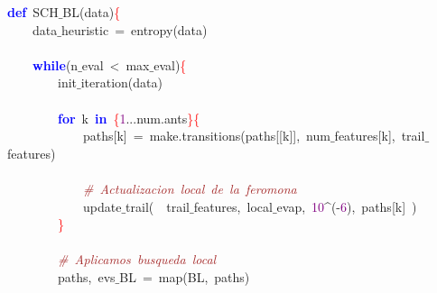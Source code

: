 \noindent
\mbox{}\textbf{\textcolor{Blue}{def}}\ SCH$\_$BL\textcolor{BrickRed}{(}data\textcolor{BrickRed}{)}\textcolor{Red}{\{} \\
\mbox{}\ \ \ \ data$\_$heuristic\ \textcolor{BrickRed}{=}\ entropy\textcolor{BrickRed}{(}data\textcolor{BrickRed}{)} \\
\mbox{} \\
\mbox{}\ \ \ \ \textbf{\textcolor{Blue}{while}}\textcolor{BrickRed}{(}n$\_$eval\ \textcolor{BrickRed}{\textless{}}\ max$\_$eval\textcolor{BrickRed}{)}\textcolor{Red}{\{} \\
\mbox{}\ \ \ \ \ \ \ \ init$\_$iteration\textcolor{BrickRed}{(}data\textcolor{BrickRed}{)} \\
\mbox{} \\
\mbox{}\ \ \ \ \ \ \ \ \textbf{\textcolor{Blue}{for}}\ k\ \textbf{\textcolor{Blue}{in}}\ \textcolor{Red}{\{}\textcolor{Purple}{1}\textcolor{BrickRed}{...}num\textcolor{BrickRed}{.}ants\textcolor{Red}{\}\{} \\
\mbox{}\ \ \ \ \ \ \ \ \ \ \ \ paths\textcolor{BrickRed}{[}k\textcolor{BrickRed}{]}\ \textcolor{BrickRed}{=}\ make\textcolor{BrickRed}{.}transitions\textcolor{BrickRed}{(}paths\textcolor{BrickRed}{[[}k\textcolor{BrickRed}{]],}\ num$\_$features\textcolor{BrickRed}{[}k\textcolor{BrickRed}{],}\ trail$\_$features\textcolor{BrickRed}{)} \\
\mbox{} \\
\mbox{}\ \ \ \ \ \ \ \ \ \ \ \ \textit{\textcolor{Brown}{\#\ Actualizacion\ local\ de\ la\ feromona}} \\
\mbox{}\ \ \ \ \ \ \ \ \ \ \ \ update$\_$trail\textcolor{BrickRed}{(}\ \ trail$\_$features\textcolor{BrickRed}{,}\ local$\_$evap\textcolor{BrickRed}{,}\ \textcolor{Purple}{10}\textcolor{BrickRed}{\textasciicircum{}(-}\textcolor{Purple}{6}\textcolor{BrickRed}{),}\ paths\textcolor{BrickRed}{[}k\textcolor{BrickRed}{]}\ \textcolor{BrickRed}{)} \\
\mbox{}\ \ \ \ \ \ \ \ \textcolor{Red}{\}} \\
\mbox{} \\
\mbox{}\ \ \ \ \ \ \ \ \textit{\textcolor{Brown}{\#\ Aplicamos\ busqueda\ local}} \\
\mbox{}\ \ \ \ \ \ \ \ paths\textcolor{BrickRed}{,}\ evs$\_$BL\ \textcolor{BrickRed}{=}\ map\textcolor{BrickRed}{(}BL\textcolor{BrickRed}{,}\ paths\textcolor{BrickRed}{)} \\
\mbox{} \\
